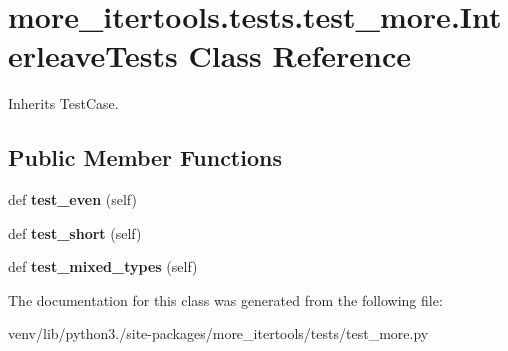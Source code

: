 \hypertarget{classmore__itertools_1_1tests_1_1test__more_1_1_interleave_tests}{}\section{more\+\_\+itertools.\+tests.\+test\+\_\+more.\+Interleave\+Tests Class Reference}
\label{classmore__itertools_1_1tests_1_1test__more_1_1_interleave_tests}


Inherits Test\+Case.

\subsection*{Public Member Functions}
\begin{DoxyCompactItemize}
\item 
\mbox{\label{classmore__itertools_1_1tests_1_1test__more_1_1_interleave_tests_a88ebe44b7e4ae85cc3a14a24de1663b2}} 
def {\bfseries test\+\_\+even} (self)
\item 
\mbox{\label{classmore__itertools_1_1tests_1_1test__more_1_1_interleave_tests_a546773a1d96bcdbf26fc9c6bbb8dc6c6}} 
def {\bfseries test\+\_\+short} (self)
\item 
\mbox{\label{classmore__itertools_1_1tests_1_1test__more_1_1_interleave_tests_a63f2d79c33aa625a48160b89776c3434}} 
def {\bfseries test\+\_\+mixed\+\_\+types} (self)
\end{DoxyCompactItemize}


The documentation for this class was generated from the following file\+:\begin{DoxyCompactItemize}
\item 
venv/lib/python3./site-\/packages/more\+\_\+itertools/tests/test\+\_\+more.\+py\end{DoxyCompactItemize}
